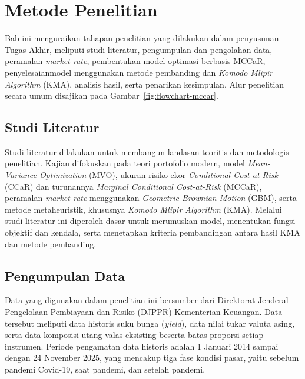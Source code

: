 \chapter{Metode Penelitian}\label{ch:method}

Bab ini menguraikan tahapan penelitian yang dilakukan dalam penyusunan Tugas Akhir, meliputi studi literatur, pengumpulan dan pengolahan data, peramalan \textit{market rate}, pembentukan model optimasi berbasis MCCaR, penyelesaianmodel menggunakan metode pembanding dan \textit{Komodo Mlipir Algorithm} (KMA), analisis hasil, serta penarikan kesimpulan. Alur penelitian secara umum disajikan pada Gambar~\ref{fig:flowchart-mccar}.




\section{Studi Literatur}\label{sec:studi-literatur}
Studi literatur dilakukan untuk membangun landasan teoritis dan metodologis penelitian. Kajian difokuskan pada teori portofolio modern, model \textit{Mean-Variance Optimization} (MVO), ukuran risiko ekor \textit{Conditional Cost-at-Risk} (CCaR) dan turunannya \textit{Marginal Conditional Cost-at-Risk} (MCCaR), peramalan \textit{market rate} menggunakan \textit{Geometric Brownian Motion} (GBM), serta metode metaheuristik, khususnya \textit{Komodo Mlipir Algorithm} (KMA). Melalui studi literatur ini diperoleh dasar untuk merumuskan model, menentukan fungsi objektif dan kendala, serta menetapkan kriteria pembandingan antara hasil KMA dan metode pembanding.


\section{Pengumpulan Data}\label{sec:pengumpulan-data}
Data yang digunakan dalam penelitian ini bersumber dari Direktorat Jenderal Pengelolaan Pembiayaan dan Risiko (DJPPR) Kementerian Keuangan. Data tersebut meliputi data historis suku bunga (\textit{yield}), data nilai tukar valuta asing, serta data komposisi utang valas eksisting beserta batas proporsi setiap instrumen. Periode pengamatan data historis adalah 1 Januari 2014 sampai dengan 24 November 2025, yang mencakup tiga fase kondisi pasar, yaitu sebelum pandemi Covid-19, saat pandemi, dan setelah pandemi.

